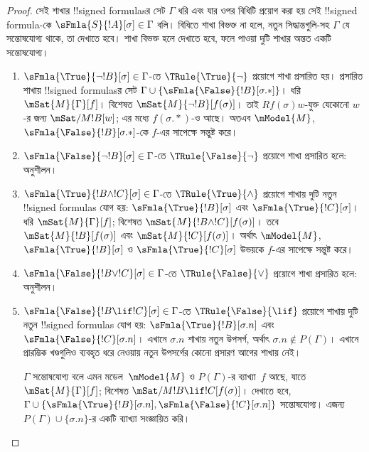 \documentclass[../../../include/open-logic-section]{subfiles}
\begin{document}
\begin{proof}
সেই শাখার !!{signed formula}sর সেট $\Gamma$ ধরি এবং
যার ওপর বিধিটি প্রয়োগ করা হয় সেই !!{signed formula}-কে
$\sFmla{S}{!A}[\sigma] \in \Gamma$ বলি। বিধিতে শাখা
বিভক্ত না হলে, নতুন সিদ্ধান্তগুলি-সহ $\Gamma$ যে সন্তোষযোগ্য
থাকে, তা দেখাতে হবে। শাখা বিভক্ত হলে দেখাতে হবে, ফলে
পাওয়া দুটি শাখার অন্তত একটি সন্তোষযোগ্য।
\begin{enumerate}
\item $\sFmla{\True}{\lnot !B}[\sigma] \in \Gamma$-তে
  $\TRule{\True}{\lnot}$ প্রয়োগে শাখা প্রসারিত হয়। প্রসারিত
  শাখায় !!{signed formula}sর সেট
  $\Gamma \cup \{\sFmla{\False}{!B}[\sigma.{*}]\}$। ধরি
  $\mSat{M}{\Gamma}[f]$। বিশেষত
  $\mSat{M}{\lnot !B}[f(\sigma)]$। তাই $Rf(\sigma)w$-যুক্ত
  যেকোনো $w$-র জন্য $\mSat/{M}{!B}[w]$; এর মধ্যে
  $f(\sigma.{*})$-ও আছে। অতএব $\mModel{M}$,
  $\sFmla{\False}{!B}[\sigma.{*}]$-কে $f$-এর সাপেক্ষে
  সন্তুষ্ট করে।
\item $\sFmla{\False}{\lnot !B}[\sigma] \in \Gamma$-তে
  $\TRule{\False}{\lnot}$ প্রয়োগে শাখা প্রসারিত হলে:
  অনুশীলন।
\item $\sFmla{\True}{!B \land !C}[\sigma] \in \Gamma$-তে
  $\TRule{\True}{\land}$ প্রয়োগে শাখায় দুটি নতুন
  !!{signed formula}s যোগ হয়:
  $\sFmla{\True}{!B}[\sigma]$ এবং
  $\sFmla{\True}{!C}[\sigma]$। ধরি
  $\mSat{M}{\Gamma}[f]$; বিশেষত
  $\mSat{M}{!B \land !C}[f(\sigma)]$। তবে
  $\mSat{M}{!B}[f(\sigma)]$ এবং
  $\mSat{M}{!C}[f(\sigma)]$। অর্থাৎ $\mModel{M}$,
  $\sFmla{\True}{!B}[\sigma]$ ও
  $\sFmla{\True}{!C}[\sigma]$ উভয়কে $f$-এর সাপেক্ষে
  সন্তুষ্ট করে।
\item $\sFmla{\False}{!B \lor !C}[\sigma] \in \Gamma$-তে
  $\TRule{\False}{\lor}$ প্রয়োগে শাখা প্রসারিত হলে:
  অনুশীলন।
\item $\sFmla{\False}{!B \lif !C}[\sigma] \in \Gamma$-তে
  $\TRule{\False}{\lif}$ প্রয়োগে শাখায় দুটি নতুন
  !!{signed formula}s যোগ হয়:
  $\sFmla{\True}{!B}[\sigma.n]$ এবং
  $\sFmla{\False}{!C}[\sigma.n]$। এখানে $\sigma.n$
  শাখায় নতুন উপসর্গ, অর্থাৎ $\sigma.n \notin P(\Gamma)$।
  এখানে প্রারম্ভিক খণ্ডগুলিও ব্যবহৃত ধরে নেওয়ায় নতুন উপসর্গের
  কোনো প্রসারণ আগের শাখায় নেই।

  $\Gamma$ সন্তোষযোগ্য বলে এমন মডেল~$\mModel{M}$ ও
  $P(\Gamma)$-র ব্যাখ্যা~$f$ আছে, যাতে
  $\mSat{M}{\Gamma}[f]$; বিশেষত
  $\mSat/{M}{!B \lif !C}[f(\sigma)]$। দেখাতে হবে,
  $\Gamma \cup \{\sFmla{\True}{!B}[\sigma.n],
  \sFmla{\False}{!C}[\sigma.n]\}$ সন্তোষযোগ্য। এজন্য
  $P(\Gamma) \cup \{\sigma.n\}$-র একটি ব্যাখ্যা সংজ্ঞায়িত করি।


\end{enumerate}
\end{proof}
\end{document}
